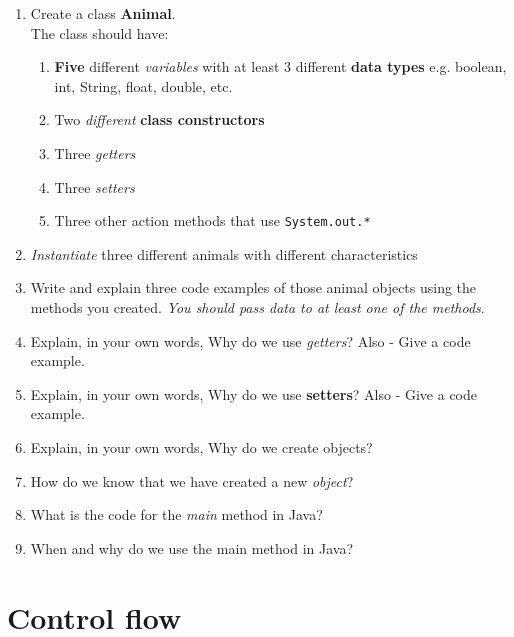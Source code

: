\documentclass{article}
\begin{document}
\begin{flushleft}
\begin{enumerate}
\item Create a class \textbf{Animal}. \\The class should have:
  \\
   \begin{enumerate}
   \item \textbf{Five} different \emph{variables} with at least 3 different \textbf{data types} e.g. boolean, int, String, float, double, etc.
   \item Two \emph{different} \textbf{class constructors}
   \item Three \emph{getters}
   \item Three \emph{setters}
   \item Three other action methods that use \texttt{System.out.*}
   \end{enumerate}

\item \emph{Instantiate} three different animals with different characteristics

  \item Write and explain three code examples of those animal objects using the methods you created. \textit{You should pass data to at least one of the methods}.
  
\item Explain, in your own words, Why do we use \emph{getters}? Also - Give a code example.
  
\item Explain, in your own words, Why do we use \textbf{setters}? Also - Give a code example.

\item Explain, in your own words, Why do we create objects?

\item How do we know that we have created a new \emph{object}?

\item What is the code for the \emph{main} method in Java?

\item When and why do we use the main method in Java?


\end{enumerate}


\newpage
\section{{\LARGE Control flow}}


\end{flushleft}
\end{document}
